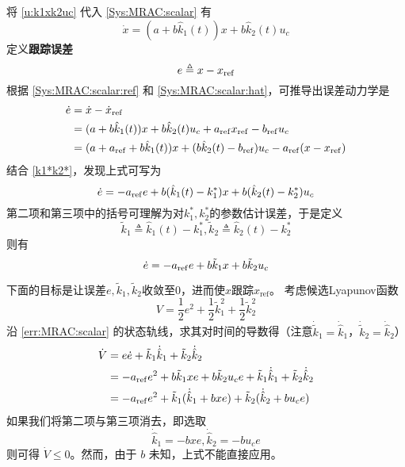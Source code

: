 将 \eqref{u:k1xk2uc} 代入 \eqref{Sys:MRAC:scalar} 有
\begin{equation}
  \dot{x} = (a + b \hat{k}_1 (t)) x + b \hat{k}_2 (t) u_c \label{Sys:MRAC:scalar:hat}
\end{equation}
定义{\bf 跟踪误差}
\begin{equation*}
  e \triangleq x - x_{\operatorname{ref}}
\end{equation*}
根据 \eqref{Sys:MRAC:scalar:ref} 和 \eqref{Sys:MRAC:scalar:hat}，可推导出误差动力学是
\begin{align}
  \dot{e} & = \dot{x} - \dot{x}_{\operatorname{ref}}\nonumber                                        \\
          & = (a + b \hat{k}_1 (t)) x + b \hat{k}_2 (t) u_c
  + a_{\operatorname{ref}} x_{\operatorname{ref}} - b_{\operatorname{ref}} u_c \nonumber                                   \\
          & = (a + a_{\operatorname{ref}} + b \hat{k}_1 (t)) x + (b \hat{k}_2 (t) - b_{\operatorname{ref}}) u_c
  - a_{\operatorname{ref}} (x - x_{\operatorname{ref}}) \nonumber
\end{align}
结合 \eqref{k1*k2*}，发现上式可写为
\[\dot{e} = - a_{\operatorname{ref}} e + b (\hat{k}_1(t)-k^{\ast}_1) x + b (\hat{k}_2 (t) - k^{\ast}_2) u_c\]
第二项和第三项中的括号可理解为对$k^{\ast}_1,k^{\ast}_2$的参数估计误差，于是定义
\[\tilde{k}_1 \triangleq\hat{k}_1 (t) - k^{\ast}_1,
  \tilde{k}_2 \triangleq \hat{k}_2 (t) - k^{\ast}_2\]
则有
\begin{equation}
  \dot{e} = - a_{\operatorname{ref}} e + b \tilde{k}_1 x + b \tilde{k}_2 u_c  \label{err:MRAC:scalar}
\end{equation}

下面的目标是让误差$e,\tilde{k}_1,\tilde{k}_2$收敛至$0$，进而使$x$跟踪$x_\mathrm{ref}$。
考虑候选Lyapunov函数
\begin{equation}
  V = \frac{1}{2} e^2 + \frac{1}{2} \tilde{k}^2_1 + \frac{1}{2} \tilde{k}^2_2\label{not_implement_candidate}
\end{equation}
沿 \eqref{err:MRAC:scalar} 的状态轨线，求其对时间的导数得（注意$\dot{\tilde{k}}_1=\dot{\hat{k}}_1$，$\dot{\tilde{k}}_2=\dot{\hat{k}}_2$）
\begin{align}
  \dot{V} & = e  \dot{e} + \tilde{k} _1 \dot{\hat{k}}_1 + \tilde{k} _2 \dot{\hat{k}}_2 \nonumber           \\
          & = - a_{\operatorname{ref}} e^2 + b \tilde{k} _1 x  e + b \tilde{k}_2 u_c e + \tilde{k} _1 \dot{\hat{k}}_1
  + \tilde{k} _2 \dot{\hat{k}}_2 \label{not_implement_vdot_mid}                                            \\
          & = - a_{\operatorname{ref}} e^2 + \tilde{k} _1 (\dot{\hat{k}}_1 + b  x  e)
  + \tilde{k} _2 (\dot{\hat{k}}_2 + b  u_c e)
  \label{not_implement_vdot}
\end{align}
如果我们将第二项与第三项消去，即选取
\begin{equation*}
  \dot{\hat{k}}_1 = - b  x  e, \dot{\hat{k}}_2 = - b  u_c e
\end{equation*}
则可得 $\dot{V} \leq 0$。然而，由于 $b$ 未知，上式不能直接应用。

